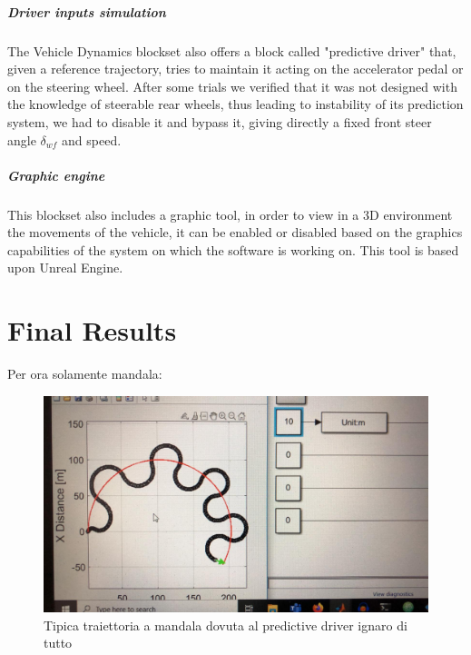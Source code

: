 \documentclass[a4paper,12pt,titlepage]{report}
\begin{document}
	\paragraph{Driver inputs simulation}
	The Vehicle Dynamics blockset also offers a block called "predictive driver" that, given a reference trajectory, tries to maintain it acting on the accelerator pedal or on the steering wheel. After some trials we verified that it was not designed with the knowledge of steerable rear wheels, thus leading to instability of its prediction system, we had to disable it and bypass it, giving directly a fixed front steer angle $\delta_{wf}$ and speed.
	\paragraph{Graphic engine}
	This blockset also includes a graphic tool, in order to view in a 3D environment the movements of the vehicle, it can be enabled or disabled based on the graphics capabilities of the system on which the software is working on. This tool is based upon Unreal Engine.
\chapter{Final Results}
Per ora solamente mandala:\\
\begin{figure}[!h]
\centering
\includegraphics[scale=0.2]{mandala1}
\caption{Tipica traiettoria a mandala dovuta al predictive driver ignaro di tutto}
\end{figure}
\end{document}
